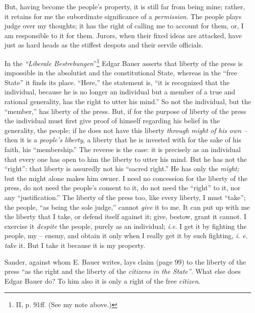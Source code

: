 \documentclass[12pt,a4paper]{book}
\begin{document}
But, having become the people's property, it is still far from being mine; 
rather, it retains for me the subordinate significance of a 
\textit{permission}. The people plays judge over my thoughts; it has the right 
of calling me to account for them, or, I am responsible to it for them. 
Jurors, when their fixed ideas are attacked, have just as hard heads as the 
stiffest despots and their servile officials.

In the \textit{``Liberale Bestrebungen}''\footnote{II, p. 91ff. (See my note 
above.)} Edgar Bauer asserts that liberty of the press is impossible in the 
absolutist and the constitutional State, whereas in the ``free State'' it 
finds its place. ``Here,'' the statement is, ``it is recognized that the 
individual, because he is no longer an individual but a member of a true and 
rational generality, has the right to utter his mind.'' So not the 
individual, but the ``member,'' has liberty of the press. But, if for the 
purpose of liberty of the press the individual must first give proof of 
himself regarding his belief in the generality, the people; if he does not 
have this liberty \textit{through might of his own --} then it is a 
\textit{people's liberty}, a liberty that he is invested with for the sake of 
his faith, his ``membership.'' The reverse is the case: it is precisely as 
an individual that every one has open to him the liberty to utter his mind. 
But he has not the ``right'': that liberty is assuredly not his ``sacred 
right.'' He has only the \textit{might;} but the might alone makes him owner. 
I need no concession for the liberty of the press, do not need the people's 
consent to it, do not need the ``right'' to it, nor any ``justification.'' 
The liberty of the press too, like every liberty, I must ``take''; the 
people, ``as being the sole judge,'' cannot \textit{give} it to me. It can 
put up with me the liberty that I take, or defend itself against it; give, 
bestow, grant it cannot. I exercise it \textit{despite} the people, purely as 
an individual; \textit{i.e.} I get it by fighting the people, my -- enemy, and 
obtain it only when I really get it by such fighting, \textit{i. e. take} it. 
But I take it because it is my property.

Sander, against whom E. Bauer writes, lays claim (page 99) to the liberty of 
the press ``as the right and the liberty of the \textit{citizens in the 
State''}. What else does Edgar Bauer do? To him also it is only a right of 
the free \textit{citizen}.
\end{document}

